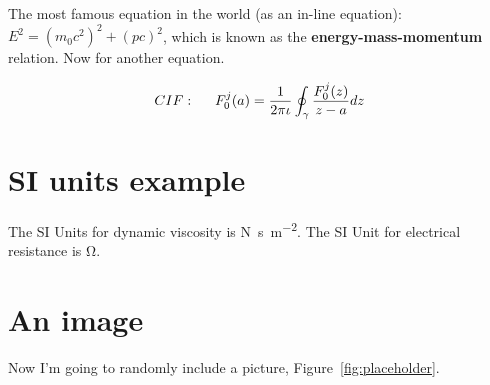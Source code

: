 The most famous equation in the world (as an in-line equation): $E^2 = (m_0c^2)^2 + (pc)^2$, which is known as the \textbf{energy-mass-momentum} relation. Now for another equation.

\begin{align}
CIF: \hspace*{5mm}F_0^j(a) = \frac{1}{2\pi \iota} \oint_{\gamma} \frac{F_0^j(z)}{z - a} dz
\end{align}

\nomenclature[g-p]{$\pi$}{ $\simeq 3.14\ldots$}                         %

\section{SI units example}
The SI Units for dynamic viscosity is \si{\newton\second\per\metre\squared}. The SI Unit for electrical resistance is \si{\ohm}.

\section{An image}

Now I'm going to randomly include a picture, Figure~\ref{fig:placeholder}.

